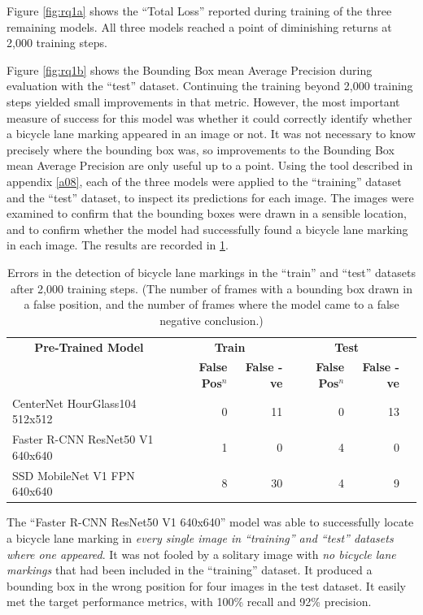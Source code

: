 \documentclass[11pt,twoside]{report}
\begin{document}
Figure \ref{fig:rq1a} shows the ``Total Loss'' reported during training of the three remaining models.  All three models reached a point of diminishing returns at 2,000 training steps.

Figure \ref{fig:rq1b} shows the Bounding Box mean Average Precision during evaluation with the ``test'' dataset.  Continuing the training beyond 2,000 training steps yielded small improvements in that metric.  However, the most important measure of success for this model was whether it could correctly identify whether a bicycle lane marking appeared in an image or not.  It was not necessary to know precisely where the bounding box was, so improvements to the Bounding Box mean Average Precision are only useful up to a point.  Using the tool described in appendix \ref{a08}, each of the three models were applied to the ``training'' dataset and the ``test'' dataset, to inspect its predictions for each image.  The images were examined to confirm that the bounding boxes were drawn in a sensible location, and to confirm whether the model had successfully found a bicycle lane marking in each image.  The results are recorded in \ref{table2}.

\begin{table}[h]
\centering
\begin{tabular}{|l|r|r|r|r|r|}
\hline
\multicolumn{1}{|c|}{\bfseries Pre-Trained Model} & \multicolumn{2}{|c|}{\bfseries Train} & \multicolumn{2}{|c|}{\bfseries Test} \\
& \textbf{False Pos$^n$} & \textbf{False -ve} & \textbf{False Pos$^n$} & \textbf{False -ve} \\
\hline
CenterNet HourGlass104 512x512 & 0 & 11 & 0 & 13 \\
Faster R-CNN ResNet50 V1 640x640 & 1 & 0 & 4 & 0 \\
SSD MobileNet V1 FPN 640x640 & 8 & 30 & 4 & 9 \\
\hline
\end{tabular}
\caption{Errors in the detection of bicycle lane markings in the ``train'' and ``test'' datasets after 2,000 training steps.  (The number of frames with a bounding box drawn in a false position, and the number of frames where the model came to a false negative conclusion.)}
\label{table2}
\end{table}

The ``Faster R-CNN ResNet50 V1 640x640'' model was able to successfully locate a bicycle lane marking in \textit{every single image in ``training'' and ``test'' datasets where one appeared}.  It was not fooled by a solitary image with \textit{no bicycle lane markings} that had been included in the ``training'' dataset.  It produced a bounding box in the wrong position for four images in the test dataset.  It easily met the target performance metrics, with 100\% recall and 92\% precision.
\end{document}

